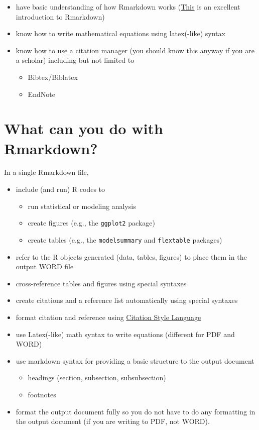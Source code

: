 \documentclass[
  letterpaper,
  DIV=11,
  numbers=noendperiod]{scrreprt}
\providecommand{\tightlist}{%
  \setlength{\itemsep}{0pt}\setlength{\parskip}{0pt}}\usepackage{longtable,booktabs,array}
\begin{document}
\begin{itemize}
\tightlist
\item
  have basic understanding of how Rmarkdown works
  (\href{https://bookdown.org/yihui/rmarkdown/basics.html}{This} is an
  excellent introduction to Rmarkdown)
\item
  know how to write mathematical equations using latex(-like) syntax
\item
  know how to use a citation manager (you should know this anyway if you
  are a scholar) including but not limited to

  \begin{itemize}
  \tightlist
  \item
    Bibtex/Biblatex
  \item
    EndNote
  \end{itemize}
\end{itemize}

\hypertarget{what-can-you-do-with-rmarkdown}{%
\section{What can you do with
Rmarkdown?}\label{what-can-you-do-with-rmarkdown}}

In a single Rmarkdown file,

\begin{itemize}
\item
  include (and run) R codes to

  \begin{itemize}
  \tightlist
  \item
    run statistical or modeling analysis\\
  \item
    create figures (e.g., the \texttt{ggplot2} package)
  \item
    create tables (e.g., the \texttt{modelsummary} and
    \texttt{flextable} packages)
  \end{itemize}
\item
  refer to the R objects generated (data, tables, figures) to place them
  in the output WORD file
\item
  cross-reference tables and figures using special syntaxes
\item
  create citations and a reference list automatically using special
  syntaxes
\item
  format citation and reference using
  \href{https://citationstyles.org/}{Citation Style Language}
\item
  use Latex(-like) math syntax to write equations (different for PDF and
  WORD)
\item
  use markdown syntax for providing a basic structure to the output
  document

  \begin{itemize}
  \tightlist
  \item
    headings (section, subsection, subsubsection)
  \item
    footnotes
  \end{itemize}
\item
  format the output document fully so you do not have to do any
  formatting in the output document (if you are writing to PDF, not
  WORD).
\end{itemize}
\end{document}

